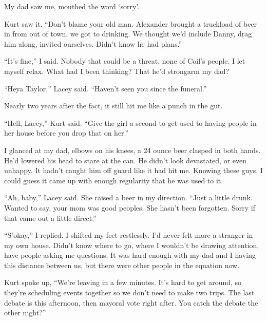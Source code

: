 My dad saw me, mouthed the word `sorry'.



Kurt saw it.  ``Don't blame your old man.  Alexander brought a truckload of beer in from out of town, we got to drinking.  We thought we'd include Danny, drag him along, invited ourselves.  Didn't know he had plans.''



``It's fine,'' I said.  Nobody that could be a threat, none of Coil's people.  I let myself relax.  What had I been thinking?  That he'd strongarm my dad?



``Heya Taylor,'' Lacey said.  ``Haven't seen you since the funeral.''



Nearly two years after the fact, it still hit me like a punch in the gut.



``Hell, Lacey,'' Kurt said.  ``Give the girl a second to get used to having people in her house before you drop that on her.''



I glanced at my dad, elbows on his knees, a 24 ounce beer clasped in both hands.  He'd lowered his head to stare at the can.  He didn't look devastated, or even unhappy.  It hadn't caught him off guard like it had hit me.  Knowing these guys, I could guess it came up with enough regularity that he was used to it.



``Ah, baby,'' Lacey said.  She raised a beer in my direction.  ``Just a little drunk.  Wanted to say, your mom was good peoples.  She hasn't been forgotten.  Sorry if that came out a little direct.''



``S'okay,'' I replied.  I shifted my feet restlessly.  I'd never felt more a stranger in my own house.  Didn't know where to go, where I wouldn't be drawing attention, have people asking me questions.  It was hard enough with my dad and I having this distance between us, but there were other people in the equation now.



Kurt spoke up, ``We're leaving in a few minutes.  It's hard to get around, so they're scheduling events together so we don't need to make two trips.  The last debate is this afternoon, then mayoral vote right after.  You catch the debate the other night?''



